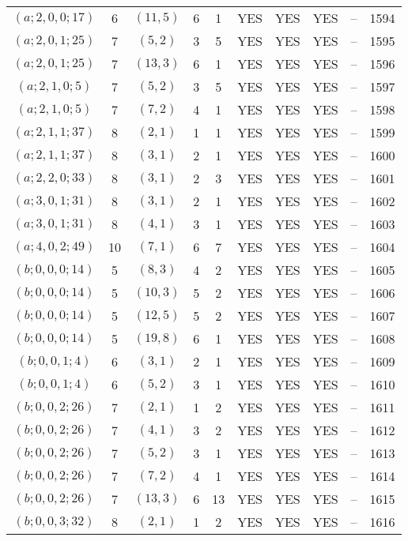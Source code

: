 \begin{longtable}{|c|c|c|c|c|c|c|c|c|c|}
$(a; 2, 0, 0; 17)$ & 6 & $(11, 5)$ & 6 & 1 & YES & YES & YES & -- & 1594\\
$(a; 2, 0, 1; 25)$ & 7 & $(5, 2)$ & 3 & 5 & YES & YES & YES & -- & 1595\\
$(a; 2, 0, 1; 25)$ & 7 & $(13, 3)$ & 6 & 1 & YES & YES & YES & -- & 1596\\
$(a; 2, 1, 0; 5)$ & 7 & $(5, 2)$ & 3 & 5 & YES & YES & YES & -- & 1597\\
$(a; 2, 1, 0; 5)$ & 7 & $(7, 2)$ & 4 & 1 & YES & YES & YES & -- & 1598\\
$(a; 2, 1, 1; 37)$ & 8 & $(2, 1)$ & 1 & 1 & YES & YES & YES & -- & 1599\\
$(a; 2, 1, 1; 37)$ & 8 & $(3, 1)$ & 2 & 1 & YES & YES & YES & -- & 1600\\
$(a; 2, 2, 0; 33)$ & 8 & $(3, 1)$ & 2 & 3 & YES & YES & YES & -- & 1601\\
$(a; 3, 0, 1; 31)$ & 8 & $(3, 1)$ & 2 & 1 & YES & YES & YES & -- & 1602\\
$(a; 3, 0, 1; 31)$ & 8 & $(4, 1)$ & 3 & 1 & YES & YES & YES & -- & 1603\\
$(a; 4, 0, 2; 49)$ & 10 & $(7, 1)$ & 6 & 7 & YES & YES & YES & -- & 1604\\
$(b; 0, 0, 0; 14)$ & 5 & $(8, 3)$ & 4 & 2 & YES & YES & YES & -- & 1605\\
$(b; 0, 0, 0; 14)$ & 5 & $(10, 3)$ & 5 & 2 & YES & YES & YES & -- & 1606\\
$(b; 0, 0, 0; 14)$ & 5 & $(12, 5)$ & 5 & 2 & YES & YES & YES & -- & 1607\\
$(b; 0, 0, 0; 14)$ & 5 & $(19, 8)$ & 6 & 1 & YES & YES & YES & -- & 1608\\
$(b; 0, 0, 1; 4)$ & 6 & $(3, 1)$ & 2 & 1 & YES & YES & YES & -- & 1609\\
$(b; 0, 0, 1; 4)$ & 6 & $(5, 2)$ & 3 & 1 & YES & YES & YES & -- & 1610\\
$(b; 0, 0, 2; 26)$ & 7 & $(2, 1)$ & 1 & 2 & YES & YES & YES & -- & 1611\\
$(b; 0, 0, 2; 26)$ & 7 & $(4, 1)$ & 3 & 2 & YES & YES & YES & -- & 1612\\
$(b; 0, 0, 2; 26)$ & 7 & $(5, 2)$ & 3 & 1 & YES & YES & YES & -- & 1613\\
$(b; 0, 0, 2; 26)$ & 7 & $(7, 2)$ & 4 & 1 & YES & YES & YES & -- & 1614\\
$(b; 0, 0, 2; 26)$ & 7 & $(13, 3)$ & 6 & 13 & YES & YES & YES & -- & 1615\\
$(b; 0, 0, 3; 32)$ & 8 & $(2, 1)$ & 1 & 2 & YES & YES & YES & -- & 1616\\

\end{longtable}
